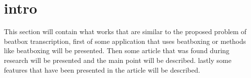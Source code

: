 \section{intro}
This section will contain what works that are similar to the proposed problem of beatbox transcription, first of some application that uses beatboxing or methods like beatboxing will be presented. Then some article that was found during research will be presented and the main point will be described. lastly some features that have been presented in the article will be described.